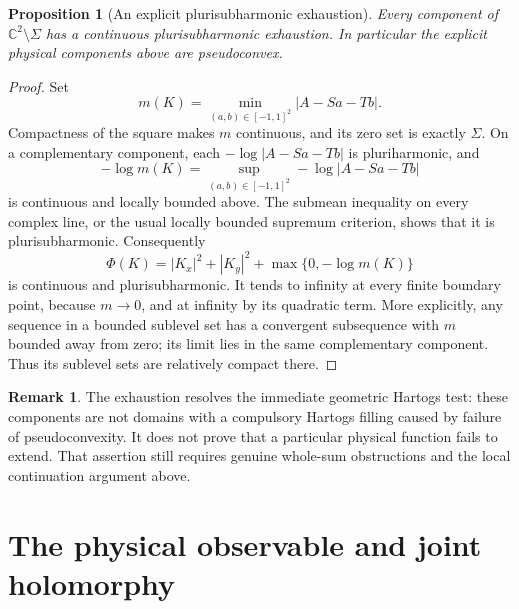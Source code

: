 \documentclass[11pt]{article}
\numberwithin{equation}{section}
\newtheorem{proposition}[theorem]{Proposition}
\theoremstyle{definition}
\newtheorem{remark}[theorem]{Remark}
\newcommand{\C}{\mathbb C}
\begin{document}
\begin{proposition}[An explicit plurisubharmonic exhaustion]
\label{geo:pseudoconvex}
Every component of \(\C^2\setminus\Sigma\) has a continuous
plurisubharmonic exhaustion.  In particular the explicit
physical components above are pseudoconvex.
\end{proposition}

\begin{proof}
Set
\[
 m(K)=\min_{(a,b)\in[-1,1]^2}|A-Sa-Tb|.
\]
Compactness of the square makes \(m\) continuous, and
its zero set is exactly \(\Sigma\).
On a complementary component, each
\(-\log|A-Sa-Tb|\) is pluriharmonic, and
\[
 -\log m(K)=
       \sup_{(a,b)\in[-1,1]^2}-\log|A-Sa-Tb|
\]
is continuous and locally bounded above.
The submean inequality on every complex line, or the
usual locally bounded supremum criterion, shows that
it is plurisubharmonic.  Consequently
\[
 \Phi(K)=|K_x|^2+|K_y|^2+
                      \max\{0,-\log m(K)\}
\]
is continuous and plurisubharmonic.
It tends to infinity at every finite boundary point,
because \(m\to0\), and at infinity by its quadratic
term.  More explicitly, any sequence in a bounded
sublevel set has a convergent subsequence with
\(m\) bounded away from zero; its limit lies in the
same complementary component.  Thus its sublevel
sets are relatively compact there.
\end{proof}

\begin{remark}\label{geo:Hartogs-scope}
The exhaustion resolves the immediate geometric Hartogs
test: these components are not domains with a compulsory
Hartogs filling caused by failure of pseudoconvexity.
It does not prove that a particular physical function
fails to extend.  That assertion still requires genuine
whole-sum obstructions and the local continuation argument
above.
\end{remark}

\section{The physical observable and joint holomorphy}
\label{ana:physical}
\end{document}
